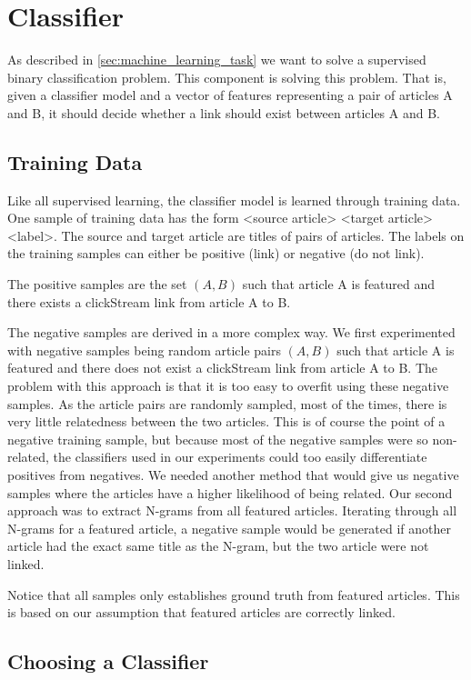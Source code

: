 \section{Classifier}
As described in \cref{sec:machine_learning_task} we want to solve a supervised binary classification problem. This component is solving this problem. That is, given a classifier model and a vector of features representing a pair of articles A and B, it should decide whether a link should exist between articles A and B.

\subsection{Training Data}
Like all supervised learning, the classifier model is learned through training data. One sample of training data has the form <source article> <target article> <label>. The source and target article are titles of pairs of articles. The labels on the training samples can either be positive (link) or negative (do not link).

The positive samples are the set $(A,B)$ such that article A is featured and there exists a clickStream link from article A to B.

The negative samples are derived in a more complex way. We first experimented with negative samples being random article pairs $(A,B)$ such that article A is featured and there does not exist a clickStream link from article A to B. The problem with this approach is that it is too easy to overfit using these negative samples. As the article pairs are randomly sampled, most of the times, there is very little relatedness between the two articles. This is of course the point of a negative training sample, but because most of the negative samples were so non-related, the classifiers used in our experiments could too easily differentiate positives from negatives. We needed another method that would give us negative samples where the articles have a higher likelihood of being related. Our second approach was to extract N-grams from all featured articles. Iterating through all N-grams for a featured article, a negative sample would be generated if another article had the exact same title as the N-gram, but the two article were not linked.

Notice that all samples only establishes ground truth from featured articles. This is based on our assumption that featured articles are correctly linked.

\subsection{Choosing a Classifier}

